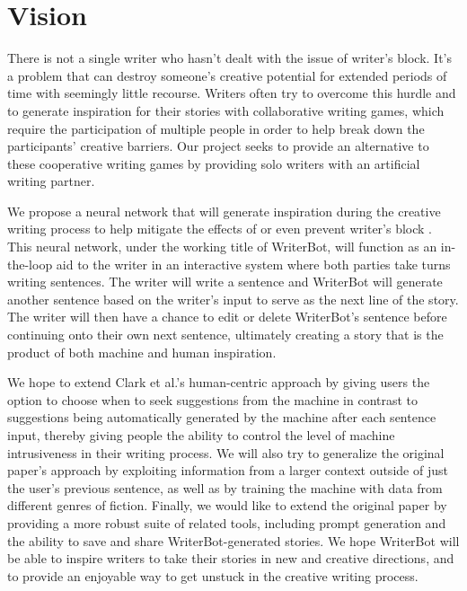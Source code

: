 \section{Vision}\label{sec:vison}
There is not a single writer who hasn’t dealt with the issue of writer's block.
It’s a problem that can destroy someone's creative potential for extended periods
of time with seemingly little recourse.  Writers often try to overcome this hurdle
and to generate inspiration for their stories with collaborative writing games,
which require the participation of multiple people in order to help break down
the participants’ creative barriers. Our project seeks to provide an alternative
to these cooperative writing games by providing solo writers with an artificial
writing partner.

We propose a neural network that will generate inspiration during the creative
writing process to help mitigate the effects of or even prevent writer's block
\cite{clark}. This neural network, under the working title of WriterBot, will
function as an in-the-loop aid to the writer in an interactive system where both
parties take turns writing sentences. The writer will write a sentence and
WriterBot will generate another sentence based on the writer’s input to serve
as the next line of the story. The writer will then have a chance to edit or
delete WriterBot’s sentence before continuing onto their own next sentence,
ultimately creating a story that is the product of both machine and human
inspiration.

We hope to extend Clark et al.’s\cite{clark} human-centric approach by giving users the
option to choose when to seek suggestions from the machine \cite{creative_help}
in contrast to suggestions being automatically generated by the machine after
each sentence input, thereby giving people the ability to control the level of
machine intrusiveness in their writing process.  We will also try to generalize
the original paper’s approach by exploiting information from a larger context
outside of just the user’s previous sentence, as well as by training the machine
with data from different genres of fiction.  Finally, we would like to extend the
original paper by providing a more robust suite of related tools, including prompt
generation and the ability to save and share WriterBot-generated stories.
We hope WriterBot will be able to inspire writers to take their stories in
new and creative directions, and to provide an enjoyable way to get unstuck
in the creative writing process.
